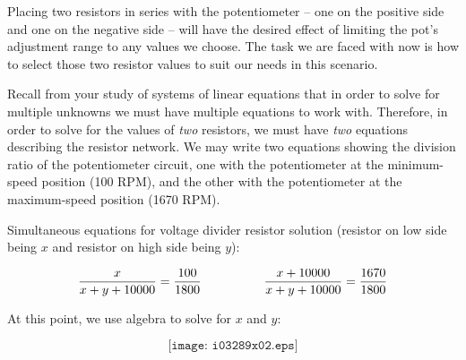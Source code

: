 \vskip 10pt

Placing two resistors in series with the potentiometer -- one on the positive side and one on the negative side -- will have the desired effect of limiting the pot's adjustment range to any values we choose.  The task we are faced with now is how to select those two resistor values to suit our needs in this scenario.

\vskip 10pt

Recall from your study of systems of linear equations that in order to solve for multiple unknowns we must have multiple equations to work with.  Therefore, in order to solve for the values of {\it two} resistors, we must have {\it two} equations describing the resistor network.  We may write two equations showing the division ratio of the potentiometer circuit, one with the potentiometer at the minimum-speed position (100 RPM), and the other with the potentiometer at the maximum-speed position (1670 RPM).

\vskip 10pt

Simultaneous equations for voltage divider resistor solution (resistor on low side being $x$ and resistor on high side being $y$):

$${x \over {x + y + 10000}} = {100 \over 1800} \hskip 50pt {{x + 10000} \over {x + y + 10000}} = {1670 \over 1800}$$

At this point, we use algebra to solve for $x$ and $y$:

$$\texttt{[image: i03289x02.eps]}$$




